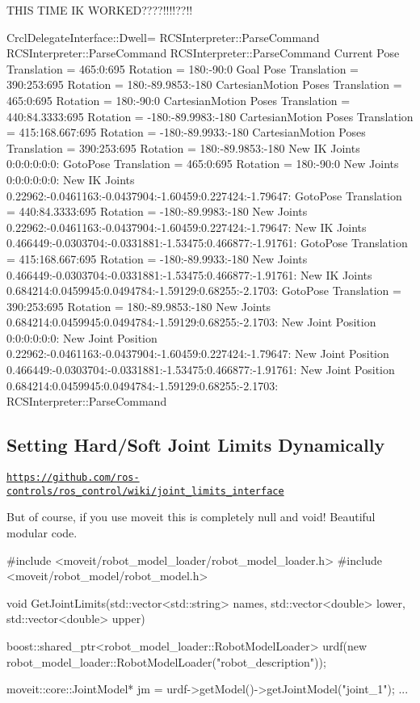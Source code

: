 T\-H\-I\-S T\-I\-M\-E I\-K W\-O\-R\-K\-E\-D????!!!!??!!

\begin{DoxyVerb}CrclDelegateInterface::Dwell=%
RCSInterpreter::ParseCommand
RCSInterpreter::ParseCommand
RCSInterpreter::ParseCommand
Current Pose Translation = 465:0:695
Rotation = 180:-90:0
Goal Pose Translation = 390:253:695
Rotation = 180:-89.9853:-180
CartesianMotion  Poses Translation = 465:0:695
Rotation = 180:-90:0
CartesianMotion  Poses Translation = 440:84.3333:695
Rotation = -180:-89.9983:-180
CartesianMotion  Poses Translation = 415:168.667:695
Rotation = -180:-89.9933:-180
CartesianMotion  Poses Translation = 390:253:695
Rotation = 180:-89.9853:-180
New IK Joints 0:0:0:0:0:0:
GotoPose Translation = 465:0:695
Rotation = 180:-90:0
New Joints 0:0:0:0:0:0:
New IK Joints 0.22962:-0.0461163:-0.0437904:-1.60459:0.227424:-1.79647:
GotoPose Translation = 440:84.3333:695
Rotation = -180:-89.9983:-180
New Joints 0.22962:-0.0461163:-0.0437904:-1.60459:0.227424:-1.79647:
New IK Joints 0.466449:-0.0303704:-0.0331881:-1.53475:0.466877:-1.91761:
GotoPose Translation = 415:168.667:695
Rotation = -180:-89.9933:-180
New Joints 0.466449:-0.0303704:-0.0331881:-1.53475:0.466877:-1.91761:
New IK Joints 0.684214:0.0459945:0.0494784:-1.59129:0.68255:-2.1703:
GotoPose Translation = 390:253:695
Rotation = 180:-89.9853:-180
New Joints 0.684214:0.0459945:0.0494784:-1.59129:0.68255:-2.1703:
New Joint Position 0:0:0:0:0:0:
New Joint Position 0.22962:-0.0461163:-0.0437904:-1.60459:0.227424:-1.79647:
New Joint Position 0.466449:-0.0303704:-0.0331881:-1.53475:0.466877:-1.91761:
New Joint Position 0.684214:0.0459945:0.0494784:-1.59129:0.68255:-2.1703:
RCSInterpreter::ParseCommand
\end{DoxyVerb}


\subsection*{Setting Hard/\-Soft Joint Limits Dynamically }

\href{https://github.com/ros-controls/ros_control/wiki/joint_limits_interface}{\tt https\-://github.\-com/ros-\/controls/ros\-\_\-control/wiki/joint\-\_\-limits\-\_\-interface}

But of course, if you use moveit this is completely null and void! Beautiful modular code. \begin{DoxyVerb}#include <moveit/robot_model_loader/robot_model_loader.h>
#include <moveit/robot_model/robot_model.h>

void GetJointLimits(std::vector<std::string> names, std::vector<double> lower, std::vector<double> upper) {
     boost::shared_ptr<robot_model_loader::RobotModelLoader>  urdf(new robot_model_loader::RobotModelLoader("robot_description"));


     moveit::core::JointModel* jm = urdf->getModel()->getJointModel("joint_1");
...
}
\end{DoxyVerb}


